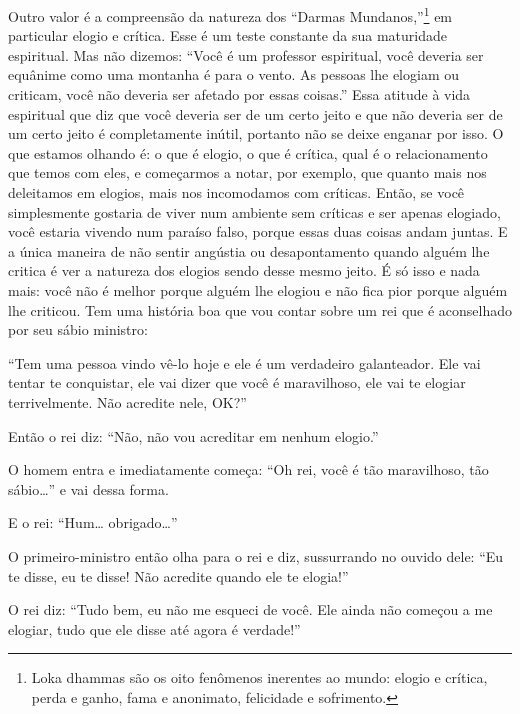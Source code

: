 Outro valor é a compreensão da natureza dos “Darmas
Mundanos,”\footnote{Loka dhammas são os oito fenômenos inerentes ao
mundo: elogio e crítica, perda e ganho, fama e anonimato, felicidade e
sofrimento.} em particular elogio e crítica. Esse é um teste constante
da sua maturidade espiritual. Mas não dizemos: “Você é um professor
espiritual, você deveria ser equânime como uma montanha é para o vento.
As pessoas lhe elogiam ou criticam, você não deveria ser afetado por
essas coisas.” Essa atitude à vida espiritual que diz que você deveria
ser de um certo jeito e que não deveria ser de um certo jeito é
completamente inútil, portanto não se deixe enganar por isso. O que
estamos olhando é: o que é elogio, o que é crítica, qual é o
relacionamento que temos com eles, e começarmos a notar, por exemplo,
que quanto mais nos deleitamos em elogios, mais nos incomodamos com
críticas. Então, se você simplesmente gostaria de viver num ambiente
sem críticas e ser apenas elogiado, você estaria vivendo num paraíso
falso, porque essas duas coisas andam juntas. E a única maneira de não
sentir angústia ou desapontamento quando alguém lhe critica é ver a
natureza dos elogios sendo desse mesmo jeito. É só isso e nada mais:
você não é melhor porque alguém lhe elogiou e não fica pior porque
alguém lhe criticou. Tem uma história boa que vou contar sobre um rei
que é aconselhado por seu sábio ministro: 

“Tem uma pessoa vindo vê-lo hoje e ele é um verdadeiro galanteador.
Ele vai tentar te conquistar, ele vai dizer que você é maravilhoso, ele
vai te elogiar terrivelmente. Não acredite nele, \textsc{OK}?” 

Então o rei diz: “Não, não vou acreditar em nenhum elogio.” 

O homem entra e imediatamente começa: “Oh rei, você é tão
maravilhoso, tão sábio\ldots{}” e vai dessa forma.

E o rei: “Hum\ldots{} obrigado\ldots{}”

O primeiro-ministro então olha para o rei e diz, sussurrando no
ouvido dele: “Eu te disse, eu te disse! Não acredite quando ele te
elogia!” 

O rei diz: “Tudo bem, eu não me esqueci de você. Ele ainda não
começou a me elogiar, tudo que ele disse até agora é verdade!” 

